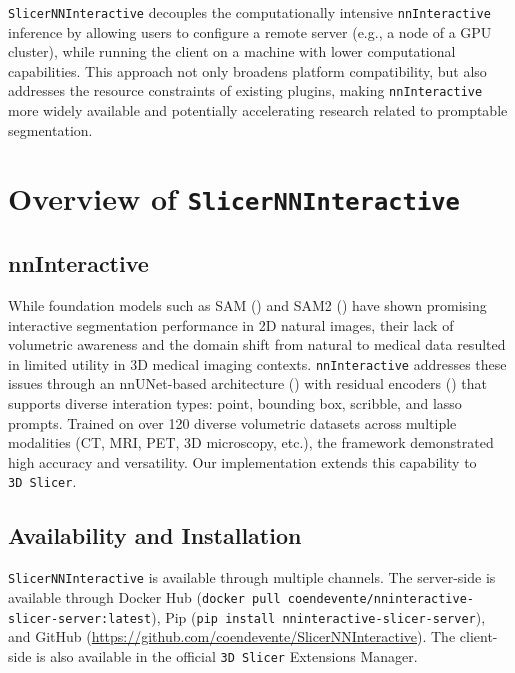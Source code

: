 \documentclass[
]{article}
\begin{document}
\texttt{SlicerNNInteractive} decouples the computationally intensive
\texttt{nnInteractive} inference by allowing users to configure a remote
server (e.g., a node of a GPU cluster), while running the client on a
machine with lower computational capabilities. This approach not only
broadens platform compatibility, but also addresses the resource
constraints of existing plugins, making \texttt{nnInteractive} more
widely available and potentially accelerating research related to
promptable segmentation.

\section{\texorpdfstring{Overview of
\texttt{SlicerNNInteractive}}{Overview of SlicerNNInteractive}}\label{overview-of-slicernninteractive}

\subsection{nnInteractive}\label{nninteractive}

While foundation models such as SAM () and SAM2 () have shown promising interactive segmentation performance in
2D natural images, their lack of volumetric awareness and the domain
shift from natural to medical data resulted in limited utility in 3D
medical imaging contexts. \texttt{nnInteractive} addresses these issues
through an nnUNet-based architecture
() with residual
encoders () that
supports diverse interation types: point, bounding box, scribble, and
lasso prompts. Trained on over 120 diverse volumetric datasets across
multiple modalities (CT, MRI, PET, 3D microscopy, etc.), the framework
demonstrated high accuracy and versatility. Our implementation extends
this capability to \texttt{3D\ Slicer}.

\subsection{Availability and
Installation}\label{availability-and-installation}

\texttt{SlicerNNInteractive} is available through multiple channels. The
server-side is available through Docker Hub
(\texttt{docker\ pull\ coendevente/nninteractive-slicer-server:latest}),
Pip (\texttt{pip\ install\ nninteractive-slicer-server}), and GitHub
(\url{https://github.com/coendevente/SlicerNNInteractive}). The
client-side is also available in the official \texttt{3D\ Slicer}
Extensions Manager.
\end{document}
